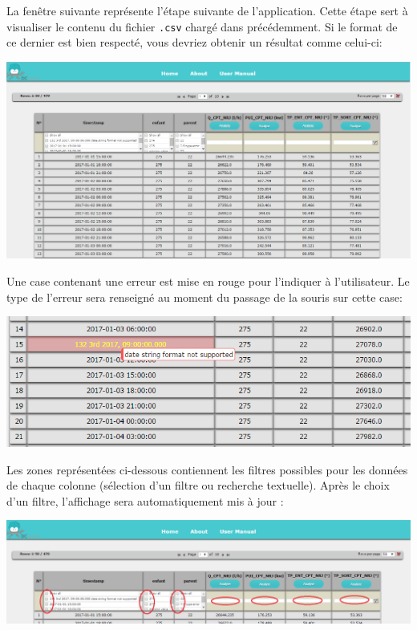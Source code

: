 		La fenêtre suivante représente l'étape suivante de l'application. Cette étape sert à visualiser le contenu du fichier \lstinline!.csv! chargé dans précédemment. Si le format de ce dernier est bien respecté, vous devriez obtenir un résultat comme celui-ci:\\
		\begin{center}\includegraphics[scale=0.45]{fenetre2.png}\end{center}
		
		Une case contenant une erreur est mise en rouge pour l'indiquer à l'utilisateur. Le type de l'erreur sera renseigné au moment du passage de la souris sur cette case: \\
		
		\begin{center}\includegraphics[scale=0.45]{fenetre2Erreur.png}\end{center}
		
		Les zones représentées ci-dessous contiennent les filtres possibles pour les données de chaque colonne (sélection d'un filtre ou recherche textuelle). Après le choix d'un filtre, l'affichage sera automatiquement mis à jour :\\
		
		\begin{center}\includegraphics[scale=0.45]{fenetre2Filtre.png}\end{center}
		
